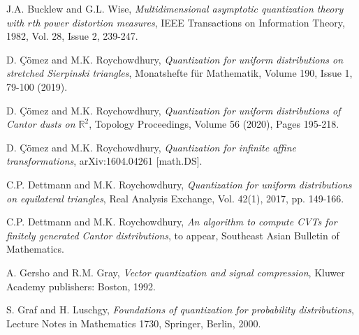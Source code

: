 \documentclass[12pt]{amsart}
\theoremstyle{plain}
\theoremstyle{definition}
\begin{document}
\begin{thebibliography}{9999}



     J.A. Bucklew and G.L. Wise, \emph{Multidimensional asymptotic quantization theory with $r$th power distortion measures}, IEEE Transactions on Information Theory, 1982, Vol. 28, Issue 2, 239-247.


 D. \c C\"omez and M.K. Roychowdhury, \emph{Quantization for uniform distributions on stretched Sierpinski triangles}, Monatshefte f\"ur Mathematik, Volume 190, Issue 1,  79-100 (2019).


 D. \c C\"omez and M.K. Roychowdhury, \emph{Quantization for uniform distributions of Cantor dusts on $\mathbb{R}^2$}, Topology Proceedings, Volume 56 (2020), Pages 195-218.
    
     D. \c C\"omez and M.K. Roychowdhury, \emph{Quantization for infinite affine transformations}, arXiv:1604.04261 [math.DS].



 C.P. Dettmann and M.K. Roychowdhury, \emph{Quantization for uniform distributions on equilateral triangles}, Real Analysis Exchange, Vol. 42(1), 2017, pp. 149-166.

 C.P. Dettmann and M.K. Roychowdhury, \emph{An algorithm to compute CVTs for finitely generated Cantor distributions}, to appear, Southeast Asian Bulletin of Mathematics.



 A. Gersho and R.M. Gray, \emph{Vector quantization and signal compression}, Kluwer Academy publishers: Boston, 1992.




 S. Graf and H. Luschgy, \emph{Foundations of quantization for probability distributions}, Lecture Notes in Mathematics 1730, Springer, Berlin, 2000.



\end{thebibliography}
\end{document}
